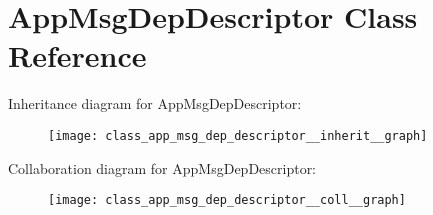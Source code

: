 \hypertarget{class_app_msg_dep_descriptor}{}\section{App\+Msg\+Dep\+Descriptor Class Reference}
\label{class_app_msg_dep_descriptor}


Inheritance diagram for App\+Msg\+Dep\+Descriptor\+:
\nopagebreak
\begin{figure}[H]
\begin{center}
\leavevmode
\texttt{[image: class\_app\_msg\_dep\_descriptor\_\_inherit\_\_graph]}
\end{center}
\end{figure}


Collaboration diagram for App\+Msg\+Dep\+Descriptor\+:
\nopagebreak
\begin{figure}[H]
\begin{center}
\leavevmode
\texttt{[image: class\_app\_msg\_dep\_descriptor\_\_coll\_\_graph]}
\end{center}
\end{figure}
